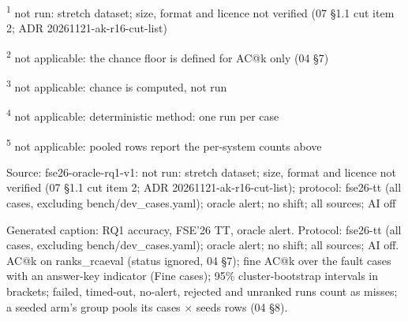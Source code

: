 \par\raggedright\noindent
\textsuperscript{1} not run: stretch dataset; size, format and licence not verified (07 \S{}1.1 cut item 2; ADR 20261121-ak-r16-cut-list)\par
\textsuperscript{2} not applicable: the chance floor is defined for AC@k only (04 \S{}7)\par
\textsuperscript{3} not applicable: chance is computed, not run\par
\textsuperscript{4} not applicable: deterministic method: one run per case\par
\textsuperscript{5} not applicable: pooled rows report the per-system counts above\par
\noindent Source: fse26-oracle-rq1-v1: not run: stretch dataset; size, format and licence not verified (07 \S{}1.1 cut item 2; ADR 20261121-ak-r16-cut-list); protocol: fse26-tt (all cases, excluding bench/\allowbreak{}dev\_cases.yaml); oracle alert; no shift; all sources; AI off\par
\noindent Generated caption: RQ1 accuracy, FSE'26 TT, oracle alert. Protocol: fse26-tt (all cases, excluding bench/\allowbreak{}dev\_cases.yaml); oracle alert; no shift; all sources; AI off. AC@k on ranks\_rcaeval (status ignored, 04 \S{}7); fine AC@k over the fault cases with an answer-key indicator (Fine cases); 95\% cluster-bootstrap intervals in brackets; failed, timed-out, no-alert, rejected and unranked runs count as misses; a seeded arm's group pools its cases $\times$ seeds rows (04 \S{}8).\par
\endgroup
